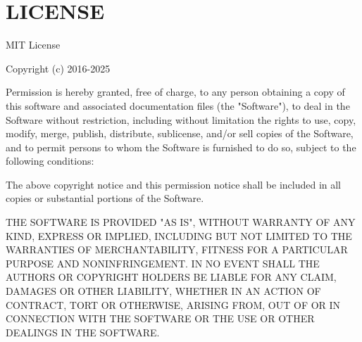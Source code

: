 \chapter{LICENSE}
\hypertarget{md_node__modules_2ts-jest_2_l_i_c_e_n_s_e}{}\label{md_node__modules_2ts-jest_2_l_i_c_e_n_s_e}
MIT License

Copyright (c) 2016-\/2025

Permission is hereby granted, free of charge, to any person obtaining a copy of this software and associated documentation files (the "{}\+Software"{}), to deal in the Software without restriction, including without limitation the rights to use, copy, modify, merge, publish, distribute, sublicense, and/or sell copies of the Software, and to permit persons to whom the Software is furnished to do so, subject to the following conditions\+:

The above copyright notice and this permission notice shall be included in all copies or substantial portions of the Software.

THE SOFTWARE IS PROVIDED "{}\+AS IS"{}, WITHOUT WARRANTY OF ANY KIND, EXPRESS OR IMPLIED, INCLUDING BUT NOT LIMITED TO THE WARRANTIES OF MERCHANTABILITY, FITNESS FOR A PARTICULAR PURPOSE AND NONINFRINGEMENT. IN NO EVENT SHALL THE AUTHORS OR COPYRIGHT HOLDERS BE LIABLE FOR ANY CLAIM, DAMAGES OR OTHER LIABILITY, WHETHER IN AN ACTION OF CONTRACT, TORT OR OTHERWISE, ARISING FROM, OUT OF OR IN CONNECTION WITH THE SOFTWARE OR THE USE OR OTHER DEALINGS IN THE SOFTWARE. 
